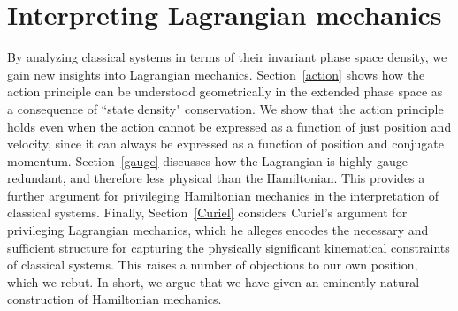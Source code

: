 \documentclass[letterpaper]{article}
\begin{document}





\section{Interpreting Lagrangian mechanics}
\label{Lagrangian}

By analyzing classical systems in terms of their invariant phase space density, we gain new insights into Lagrangian mechanics. Section~\ref{action} shows how the action principle can be understood geometrically in the extended phase space as a consequence of ``state density" conservation. We show that the action principle holds even when the action cannot be expressed as a function of just position and velocity, since it can always be expressed as a function of position and conjugate momentum. Section~\ref{gauge} discusses how the Lagrangian is highly gauge-redundant, and therefore less physical than the Hamiltonian. This provides a further argument for privileging Hamiltonian mechanics in the interpretation of classical systems. Finally, Section~\ref{Curiel} considers Curiel's \parencites*[]{Curiel} argument for privileging Lagrangian mechanics, which he alleges encodes the necessary and sufficient structure for capturing the physically significant kinematical constraints of classical systems. This raises a number of objections to our own position, which we rebut. In short, we  argue that we have given an eminently natural construction of Hamiltonian mechanics.
\end{document}
